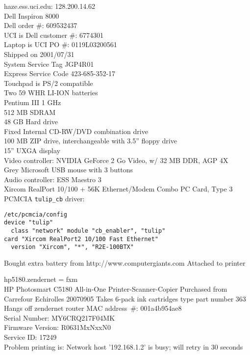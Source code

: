 \documentclass[12pt,twoside]{article}
\begin{document}
haze.ess.uci.edu: 128.200.14.62\\
Dell Inspiron 8000\\
Dell order \#: 609532437\\
UCI is Dell customer \#: 6774301\\
Laptop is UCI PO \#: 0119L03200561\\
Shipped on 2001/07/31\\
System Service Tag JGP4R01\\
Express Service Code 423-685-352-17\\
Touchpad is PS/2 compatible\\
Two 59 WHR LI-ION batteries\\
Pentium III 1 GHz\\
512 MB SDRAM\\
48 GB Hard drive\\
Fixed Internal CD-RW/DVD combination drive\\
100 MB ZIP drive, interchangeable with 3.5'' floppy drive\\
15'' UXGA display\\
Video controller: NVIDIA GeForce 2 Go Video, w/ 32 MB DDR, AGP 4X\\
Grey Microsoft USB mouse with 3 buttons\\
Audio controller: ESS Maestro 3\\
Xircom RealPort 10/100 + 56K Ethernet/Modem Combo PC Card, Type 3\\
PCMCIA \verb'tulip_cb' driver:\\
\begin{verbatim}
/etc/pcmcia/config
device "tulip"
  class "network" module "cb_enabler", "tulip"
card "Xircom RealPort2 10/100 Fast Ethernet"
  version "Xircom", "*", "R2E-100BTX"
\end{verbatim}
Bought extra battery from http://www.computergiants.com
Attached to printer

hp5180.zendernet = fxm \\
HP Photosmart C5180 All-in-One Printer-Scanner-Copier
Purchased from Carrefour Echirolles 20070905
Takes 6-pack ink cartridges type part number 363
Hangs off zendernet router
MAC address~\#: 001a4b954ae8 \\
Serial Number: MY6CRQ217F04MK \\
Firmware Version: R0631MxNxxN0 \\
Service ID: 17249 \\
Problem printing is:
Network host '192.168.1.2' is busy; will retry in 30 seconds
\end{document}
